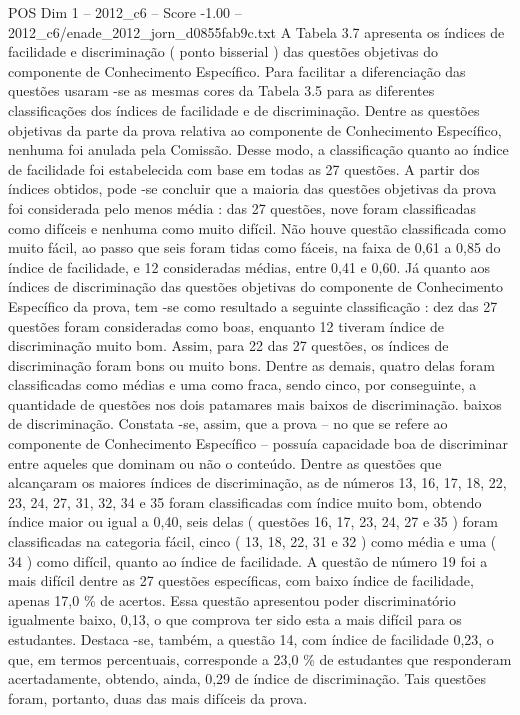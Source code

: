 \begin{textsample}{POS Dim 1 – 2012\_c6 – Score -1.00 – 2012\_c6/enade\_2012\_jorn\_d0855fab9c.txt}
A Tabela 3.7 apresenta os índices de facilidade e discriminação ( ponto bisserial ) das questões objetivas do componente de Conhecimento Específico.
Para facilitar a diferenciação das questões usaram -se as mesmas cores da Tabela 3.5 para as diferentes classificações dos índices de facilidade e de discriminação.
Dentre as questões objetivas da parte da prova relativa ao componente de Conhecimento Específico, nenhuma foi anulada pela Comissão.
Desse modo, a classificação quanto ao índice de facilidade foi estabelecida com base em todas as 27 questões.
A partir dos índices obtidos, pode -se concluir que a maioria das questões objetivas da prova foi considerada pelo menos média : das 27 questões, nove foram classificadas como difíceis e nenhuma como muito difícil.
Não houve questão classificada como muito fácil, ao passo que seis foram tidas como fáceis, na faixa de 0,61 a 0,85 do índice de facilidade, e 12 consideradas médias, entre 0,41 e 0,60.
Já quanto aos índices de discriminação das questões objetivas do componente de Conhecimento Específico da prova, tem -se como resultado a seguinte classificação : dez das 27 questões foram consideradas como boas, enquanto 12 tiveram índice de discriminação muito bom.
Assim, para 22 das 27 questões, os índices de discriminação foram bons ou muito bons.
Dentre as demais, quatro delas foram classificadas como médias e uma como fraca, sendo cinco, por conseguinte, a quantidade de questões nos dois patamares mais baixos de discriminação. baixos de discriminação.
Constata -se, assim, que a prova – no que se refere ao componente de Conhecimento Específico – possuía capacidade boa de discriminar entre aqueles que dominam ou não o conteúdo.
Dentre as questões que alcançaram os maiores índices de discriminação, as de números 13, 16, 17, 18, 22, 23, 24, 27, 31, 32, 34 e 35 foram classificadas com índice muito bom, obtendo índice maior ou igual a 0,40, seis delas ( questões 16, 17, 23, 24, 27 e 35 ) foram classificadas na categoria fácil, cinco ( 13, 18, 22, 31 e 32 ) como média e uma ( 34 ) como difícil, quanto ao índice de facilidade.
A questão de número 19 foi a mais difícil dentre as 27 questões específicas, com baixo índice de facilidade, apenas 17,0 \% de acertos.
Essa questão apresentou poder discriminatório igualmente baixo, 0,13, o que comprova ter sido esta a mais difícil para os estudantes.
Destaca -se, também, a questão 14, com índice de facilidade 0,23, o que, em termos percentuais, corresponde a 23,0 \% de estudantes que responderam acertadamente, obtendo, ainda, 0,29 de índice de discriminação.
Tais questões foram, portanto, duas das mais difíceis da prova.

\end{textsample}
